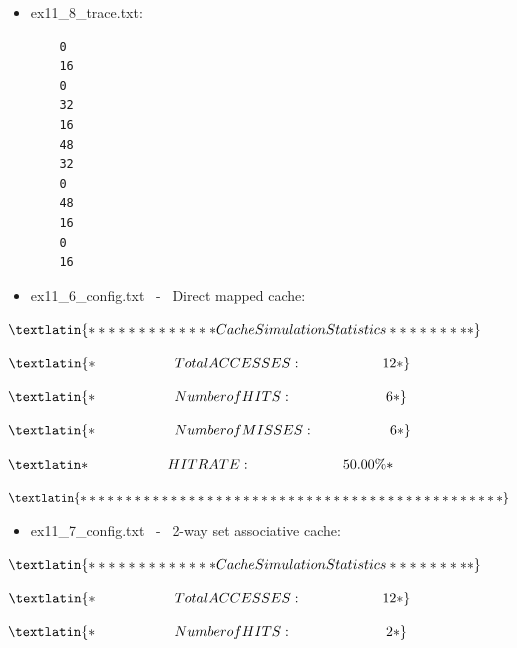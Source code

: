 \documentclass{article}
\begin{document}
\begin{itemize}
    \item \textlatin{ex11\_8\_trace.txt}:
    \begin{verbatim}
    0
    16
    0
    32
    16
    48
    32
    0
    48
    16
    0
    16
    \end{verbatim}
\end{itemize}

\begin{itemize}
    \item \textlatin{ex11\_6\_config.txt} \ - \ \textlatin{Direct mapped cache:}
\end{itemize}

$
\textlatin
{
************* Cache Simulation Statistics *********
}
$

$
\textlatin
{
* \hspace{2cm}            Total ACCESSES :  \hspace{2.02cm}               12 *
}
$

$
\textlatin
{
*     \hspace{2cm}        Number of HITS :        \hspace{2.35cm}         6 *
}
$

$
\textlatin
{
*       \hspace{2cm}      Number of MISSES :        \hspace{1.9cm}       6 *
}
$

$
\textlatin
{
*      \hspace{2cm}       HIT RATE :          \hspace{2.3cm}         50.00\% *
}
$

$
\textlatin
{
***********************************************
}
$

\vspace{0.5cm}

\begin{itemize}
    \item \textlatin{ex11\_7\_config.txt} \ - \ \textlatin{2-way set associative cache:}
\end{itemize}

$
\textlatin
{
************* Cache Simulation Statistics *********
}
$

$
\textlatin
{
* \hspace{2cm}            Total ACCESSES :  \hspace{2.02cm}               12 *
}
$

$
\textlatin
{
*     \hspace{2cm}        Number of HITS :        \hspace{2.35cm}         2 *
}
$
\end{document}
